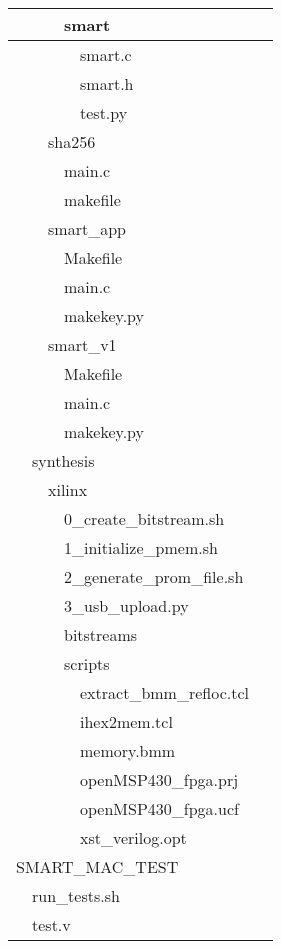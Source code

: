 \begin{longtable}{|p{0.15cm}|p{0.15cm}|p{0.15cm}|p{0.15cm}|p{0.15cm}|p{0.15cm}|p{8.6cm}|}
	\hline
	& & & \multicolumn{3}{l|}{smart} & \\
	\hline
	& & & & \multicolumn{2}{l|}{smart.c} & \\
	\hline
	& & & & \multicolumn{2}{l|}{smart.h} & \\
	\hline
	& & & & \multicolumn{2}{l|}{test.py} & \\
	\hline
	& & \multicolumn{4}{l|}{sha256} & \\
	\hline
	& & & \multicolumn{3}{l|}{main.c} & \\
	\hline
	& & & \multicolumn{3}{l|}{makefile} & \\
	\hline
	& & \multicolumn{4}{l|}{smart\_app} & \\
	\hline
	& & & \multicolumn{3}{l|}{Makefile} & \\
	\hline
	& & & \multicolumn{3}{l|}{main.c} & \\
	\hline
	& & & \multicolumn{3}{l|}{makekey.py} & \\
	\hline
	& & \multicolumn{4}{l|}{smart\_v1} & \\
	\hline
	& & & \multicolumn{3}{l|}{Makefile} & \\
	\hline
	& & & \multicolumn{3}{l|}{main.c} & \\
	\hline
	& & & \multicolumn{3}{l|}{makekey.py} & \\
	\hline
	& \multicolumn{5}{l|}{synthesis} & \\
	\hline
	& & \multicolumn{4}{l|}{xilinx} & \\
	\hline
	& & & \multicolumn{3}{l|}{0\_create\_bitstream.sh} & \\
	\hline
	& & & \multicolumn{3}{l|}{1\_initialize\_pmem.sh} & \\
	\hline
	& & & \multicolumn{3}{l|}{2\_generate\_prom\_file.sh} & \\
	\hline
	& & & \multicolumn{3}{l|}{3\_usb\_upload.py} & \\
	\hline
	& & & \multicolumn{3}{l|}{bitstreams} & \\
	\hline
	& & & \multicolumn{3}{l|}{scripts} & \\
	\hline
	& & & & \multicolumn{2}{l|}{extract\_bmm\_refloc.tcl} & \\
	\hline
	& & & & \multicolumn{2}{l|}{ihex2mem.tcl} & \\
	\hline
	& & & & \multicolumn{2}{l|}{memory.bmm} & \\
	\hline
	& & & & \multicolumn{2}{l|}{openMSP430\_fpga.prj} & \\
	\hline
	& & & & \multicolumn{2}{l|}{openMSP430\_fpga.ucf} & \\
	\hline
	& & & & \multicolumn{2}{l|}{xst\_verilog.opt} & \\
	\hline
	\multicolumn{6}{|l|}{SMART\_MAC\_TEST} & \\
	\hline
	& \multicolumn{5}{l|}{run\_tests.sh} & \\
	\hline
	& \multicolumn{5}{l|}{test.v} & \\
	\hline
\end{longtable} 